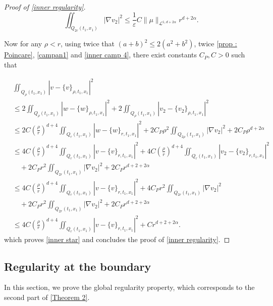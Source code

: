 \documentclass[reqno,12pt,twoside]{amsart}
\numberwithin{equation}{section} \numberwithin{theorem}{section}
\numberwithin{proposition}{section} \numberwithin{lemma}{section}
\numberwithin{corollary}{section}
\numberwithin{definition}{section} \numberwithin{remark}{section}
\begin{document}
\begin{proof}[Proof of \autoref{inner regularity}]
\begin{equation}\label{inner camp 4}
\iint_{Q_{2r}(t_1,x_1)} |\nabla v_2|^2 \leqslant \frac{1}{\varepsilon} C\|\mu\|_{\mathcal{L}^{1, d+2\alpha}} r^{d+2\alpha}.
\end{equation}

Now for any $\rho < r$, using twice that $(a+b)^2 \leqslant 2(a^2 +b^2)$, twice \autoref{prop : Poincare}, \eqref{campan1} and \eqref{inner camp 4}, there exist constants $C_P, C>0$ such that

\begin{align*}
&\iint_{Q_{\rho}(t_1,x_1)} |v -\{v\}_{\rho, t_1, x_1}|^2\\
&\leqslant 2\iint_{Q_{\rho}(t_1,x_1)} |w -\{w\}_{\rho, t_1, x_1}|^2 + 2 \iint_{Q_{\rho}(t_1,x_1)} |v_2 -\{v_2\}_{\rho, t_1, x_1}|^2\\
&\leqslant  2C\left(\frac{\rho}{r}\right)^{d+4}\iint_{Q_{r}(t_1,x_1)} |w -\{w\}_{r, t_1, x_1}|^2 + 2C_P\rho^2 \iint_{Q_{2\rho}(t_1,x_1)} |\nabla v_2|^2 + 2C_P\rho^{d+2\alpha}\\
&\leqslant 4C\left(\frac{\rho}{r}\right)^{d+4}\iint_{Q_{r}(t_1,x_1)} |v -\{v\}_{r, t_1, x_1}|^2 + 4 C\left(\frac{\rho}{r}\right)^{d+4}\iint_{Q_{r}(t_1,x_1)} |v_2 -\{v_2\}_{r, t_1, x_1}|^2 \\
&\quad + 2C_Pr^2 \iint_{Q_{2r}(t_1,x_1)} |\nabla v_2|^2 + 2C_Pr^{d+2+2\alpha} \\
&\leqslant 4C\left(\frac{\rho}{r}\right)^{d+4}\iint_{Q_{r}(t_1,x_1)} |v -\{v\}_{r, t_1, x_1}|^2  + 4C_P r^2 \iint_{Q_{2r}(t_1,x_1)} |\nabla v_2|^2\\
&\quad +2C_Pr^2 \iint_{Q_{2r}(t_1,x_1)} |\nabla v_2|^2 + 2C_Pr^{d+2+2\alpha}\\
&\leqslant 4C\left(\frac{\rho}{r}\right)^{d+4}\iint_{Q_{r}(t_1,x_1)} |v -\{v\}_{r, t_1, x_1}|^2 + Cr^{d+2+2\alpha}.
\end{align*}
which proves \eqref{inner star} and concludes the proof of \autoref{inner regularity}. 
\end{proof}

\subsection{Regularity at the boundary}

In this section, we prove the global regularity property, which corresponds to the second part of \autoref{Theorem 2}.  
\end{document}

